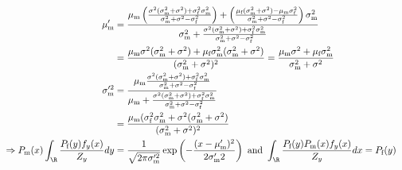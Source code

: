 \documentclass{article}\usepackage[]{graphicx}\usepackage[]{color}
\newcommand{\x}[1]{\text{#1}}
\begin{document}
\begin{landscape}
\begin{align*}
\\\mu_\x{m}'&=\frac{\mu_\x{m}\left(\frac{\sigma^2(\sigma_\x{m}^2+\sigma^2)+\sigma_\x{f}^2\sigma_\x{m}^2}{\sigma_\x{m}^2+\sigma^2-\sigma_\x{f}^2}\right)+\left(\frac{\mu_\x{f}(\sigma_\x{m}^2+\sigma^2)-\mu_\x{m}\sigma_\x{f}^2}{\sigma_\x{m}^2+\sigma^2-\sigma_\x{f}^2}\right)\sigma_\x{m}^2}{\sigma_\x{m}^2+\frac{\sigma^2(\sigma_\x{m}^2+\sigma^2)+\sigma_\x{f}^2\sigma_\x{m}^2}{\sigma_\x{m}^2+\sigma^2-\sigma_\x{f}^2}}
\\&=\frac{\mu_\x{m}\sigma^2(\sigma_\x{m}^2+\sigma^2)+\mu_\x{f}\sigma_\x{m}^2(\sigma_\x{m}^2+\sigma^2)}{(\sigma_\x{m}^2+\sigma^2)^2}=\frac{\mu_\x{m}\sigma^2+\mu_\x{f}\sigma_\x{m}^2}{\sigma_\x{m}^2+\sigma^2}
\\\sigma_\x{m}'^2&=\frac{\mu_\x{m}\frac{\sigma^2(\sigma_\x{m}^2+\sigma^2)+\sigma_\x{f}^2\sigma_\x{m}^2}{\sigma_\x{m}^2+\sigma^2-\sigma_\x{f}^2}}{\mu_\x{m}+\frac{\sigma^2(\sigma_\x{m}^2+\sigma^2)+\sigma_\x{f}^2\sigma_\x{m}^2}{\sigma_\x{m}^2+\sigma^2-\sigma_\x{f}^2}}
\\&=\frac{\mu_\x{m}(\sigma_\x{f}^2\sigma_\x{m}^2+\sigma^2(\sigma_\x{m}^2+\sigma^2)}{(\sigma_\x{m}^2+\sigma^2)^2}
\\ \Rightarrow P_\x{m}(x)\int_\R \frac{P_\x{f}(y)f_y(x)}{Z_y} dy&= \frac{1}{\sqrt{2\pi\sigma_\x{m}'^2}}\exp\left(-\frac{(x-\mu_\x{m}')^2}{2\sigma_\x{m}'2}\right) \text{ and } \int_\R\frac{P_\x{f}(y)P_\x{m}(x)f_y(x)}{Z_y}dx=P_\x{f}(y)

\end{align*}
\end{landscape}
\end{document}

